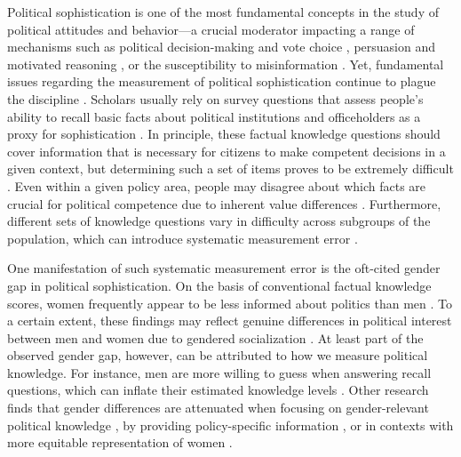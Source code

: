 

\newpage\setcounter{page}{1}

Political sophistication is one of the most fundamental concepts in the study of political attitudes and behavior---a crucial moderator impacting a range of mechanisms such as political decision-making and vote choice \citep{macdonald1995political,lau2001advantages}, persuasion and motivated reasoning \citep{zaller1992nature,lodge2013rationalizing}, or the susceptibility to misinformation \citep{vegetti2020impact}. Yet, fundamental issues regarding the measurement of political sophistication continue to plague the discipline \citep{mondak2001developing,sturgis2008experiment,bullock2021response}. Scholars usually rely on survey questions that assess people's ability to recall basic facts about political institutions and officeholders as a proxy for sophistication \citep{carpini1993measuring,barabas2014question}. In principle, these factual knowledge questions should cover information that is necessary for citizens to make competent decisions in a given context, but determining such a set of items proves to be extremely difficult \citep{lupia2006elitism}. Even within a given policy area, people may disagree about which facts are crucial for political competence due to inherent value differences \citep{lupia2015uninformed}. Furthermore, different sets of knowledge questions vary in difficulty across subgroups of the population, which can introduce systematic measurement error \citep{pietryka2013analysis}.

One manifestation of such systematic measurement error is the oft-cited gender gap in political sophistication. On the basis of conventional factual knowledge scores, women frequently appear to be less informed about politics than men \citep{verba1997knowing,wolak2011roots,fraile2014women}. To a certain extent, these findings may reflect genuine differences in political interest between men and women due to gendered socialization \citep{bos2021one}. At least part of the observed gender gap, however, can be attributed to how we measure political knowledge. For instance, men are more willing to guess when answering recall questions, which can inflate their estimated knowledge levels \citep{mondak2004knowledge,fortin2020political}. Other research finds that gender differences are attenuated when focusing on gender-relevant political knowledge \citep{dolan2011women}, by providing policy-specific information \citep{jerit2017revisiting}, or in contexts with more equitable representation of women \citep{pereira2019gendered,kraft2022glass}.

